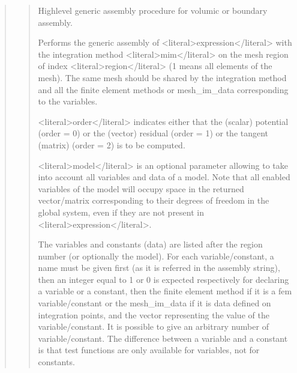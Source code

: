 \documentclass[a4paper,11pt,english]{sphinxmanual}
\begin{document}
\sphinxAtStartPar
{}
\begin{quote}

\sphinxAtStartPar
{}
\begin{quote}

\sphinxAtStartPar
High\sphinxhyphen{}level generic assembly procedure for volumic or boundary assembly.

\sphinxAtStartPar
Performs the generic assembly of \textless{}literal\textgreater{}expression\textless{}/literal\textgreater{} with the integration
method \textless{}literal\textgreater{}mim\textless{}/literal\textgreater{} on the mesh region of index \textless{}literal\textgreater{}region\textless{}/literal\textgreater{} (\sphinxhyphen{}1 means all
elements of the mesh). The same mesh should be shared by
the integration method and all the finite element methods or
mesh\_im\_data corresponding to the variables.

\sphinxAtStartPar
\textless{}literal\textgreater{}order\textless{}/literal\textgreater{} indicates either that the (scalar) potential
(order = 0) or the (vector) residual (order = 1) or the
tangent (matrix) (order = 2) is to be computed.

\sphinxAtStartPar
\textless{}literal\textgreater{}model\textless{}/literal\textgreater{} is an optional parameter allowing to take into account
all variables and data of a model. Note that all enabled variables
of the model will occupy space in the returned vector/matrix
corresponding to their degrees of freedom in the global system, even
if they are not present in \textless{}literal\textgreater{}expression\textless{}/literal\textgreater{}.

\sphinxAtStartPar
The variables and constants (data) are listed after the region number
(or optionally the model).
For each variable/constant, a name must be given first (as it is
referred in the assembly string), then an integer equal to 1 or 0
is expected respectively for declaring a variable or a constant,
then the finite element method if it is a fem variable/constant or
the mesh\_im\_data if it is data defined on integration points, and
the vector representing the value of the variable/constant.
It is possible to give an arbitrary number of variable/constant.
The difference between a variable and a constant is that test
functions are only available for variables, not for constants.


\end{quote}
\end{quote}
\end{document}
